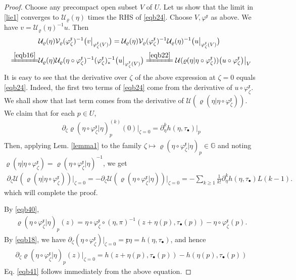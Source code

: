 \documentclass[11pt,b5paper,notitlepage]{article}
\theoremstyle{definition}
\theoremstyle{plain}
\newcommand{\fk}{\mathfrak}
\newcommand{\mc}{\mathcal}
\newcommand{\xk}{\mathfrak x}
\newcommand{\blt}{\bullet}
\newcommand{\Gbb}{\mathbb G}
\newcommand{\<}{\left\langle}
\renewcommand{\>}{\right\rangle}
\numberwithin{equation}{section}
\begin{document}
\begin{proof}
Choose any precompact open subset $V$ of $U$. Let us show that the limit in \eqref{lie1} converges to $\mc U_\varrho(\eta)$ times the RHS of \eqref{eqb24}. Choose $V,\varphi^{\fk x}$ as above. We have $v=\mc U_\varrho(\eta)^{-1}u$. Then
\begin{align*}
&\mc U_\varrho(\eta)\mc V_\varrho(\varphi^{\fk x}_\zeta)^{-1}\big(v\big|_{\varphi^{\fk x}_\zeta(V)}\big)=\mc U_\varrho(\eta)\mc V_\varrho(\varphi^{\fk x}_\zeta)^{-1}\mc U_\varrho(\eta)^{-1}\big(u\big|_{\varphi^{\fk x}_\zeta(V)}\big)\\
\xlongequal{\eqref{eqb16}}&\mc U_\varrho(\eta)\mc U_\varrho(\eta\circ\varphi^{\fk x}_\zeta)^{-1}(\varphi^{\fk x}_\zeta)_*^{-1}\big(u\big|_{\varphi^{\fk x}_\zeta(V)}\big)\xlongequal{\eqref{eqb22}}\mc U(\varrho(\eta|\eta\circ\varphi^\xk_\zeta))\big(u\circ\varphi^{\fk x}_\zeta\big)\big|_V
\end{align*}
It is easy to see that the derivative over  $\zeta$ of the above expression at $\zeta=0$ equals \eqref{eqb24}. Indeed, the first two terms of \eqref{eqb24} come from the derivative of $u\circ\varphi^{\fk x}_\zeta$. We shall show that last term comes from the derivative of $\mc U(\varrho(\eta|\eta\circ\varphi_\zeta^{\fk x}))$. We claim that for each $p\in U$,
\begin{align*}\label{eqb41}
\partial_\zeta\varrho(\eta\circ\varphi^\xk_\zeta|\eta)^{(k)}_p(0)\big|_{\zeta=0}=\partial_\eta^k h(\eta,\tau_\blt)\big|_p  \tag{$\star$}
\end{align*}
Then, applying Lem. \ref{lemma1} to the family $\zeta\mapsto \varrho(\eta\circ\varphi_\zeta^\xk|\eta)_p\in\Gbb$ and noting $\varrho(\eta|\eta\circ\varphi_\zeta^{\fk x})=\varrho(\eta\circ\varphi_\zeta^{\fk x}|\eta)^{-1}$, we get
\begin{align*}
\partial_\zeta\mc U(\varrho(\eta|\eta\circ\varphi_\zeta^{\fk x}))\big|_{\zeta=0}=-\partial_\zeta\mc U(\varrho(\eta\circ\varphi_\zeta^{\fk x}|\eta))\big|_{\zeta=0}=-\sum_{k\geq 1}\frac 1{k!}\partial_\eta^k h(\eta,\tau_\blt)L(k-1).
\end{align*}
which will complete the proof.

By \eqref{eqb40},  
\begin{align*}
\varrho(\eta\circ\varphi^\xk_\zeta|\eta)_p(z)=\eta\circ\varphi_{\zeta}^\xk\circ(\eta,\pi)^{-1}(z+\eta(p),\tau_\blt(p))-\eta\circ\varphi_\zeta^\xk(p).
\end{align*}
By \eqref{eqb18}, we have $\partial_\zeta (\eta\circ\varphi_{\zeta}^\xk)\big|_{\zeta=0}=\xk\eta=h(\eta,\tau_\blt)$, and hence
\begin{align*}
\partial_\zeta\varrho(\eta\circ\varphi^\xk_\zeta|\eta)_p(z)\big|_{\zeta=0}=h(z+\eta(p),\tau_\blt(p))-h(\eta(p),\tau_\blt(p))
\end{align*}
Eq. \eqref{eqb41} follows immediately from the above equation.
\end{proof}
\end{document}
